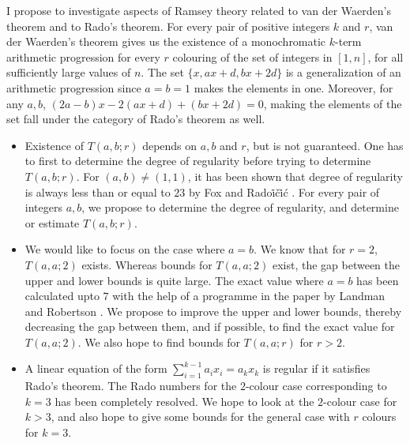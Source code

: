 \documentclass[12pt]{report}
\begin{document}
\noindent I propose to investigate aspects of Ramsey theory related to van der Waerden's theorem and to Rado's theorem. For every pair of positive integers $k$ and $r$, van der Waerden's theorem gives us the existence of a monochromatic $k$-term arithmetic progression for every $r$ colouring of the set of integers in $[1,n]$, for all sufficiently large values of $n$. The set $\{x,ax+d,bx+2d\}$ is a generalization of an arithmetic progression since $a=b=1$ makes the elements in one. Moreover, for any $a,b$, $(2a-b)x-2(ax+d)+(bx+2d)=0$, making the elements of the set fall under the category of Rado's theorem as well.  
\begin{itemize}
\item
Existence of $T(a,b;r)$ depends on $a,b$ and $r$, but is not guaranteed. One has to first to determine the degree of regularity before trying to determine $T(a,b;r)$. For $(a,b)\neq (1,1)$, it has been shown that degree of regularity is always less than or equal to $23$ by Fox and Rado\.{i}\v{c}\.{i}\'{c} {\cite{FR}}. For every pair of integers $a,b$, we propose to determine the degree of regularity, and determine or estimate $T(a,b;r)$.
\item
We would like to focus on the case where $a=b$. We know that for $r=2$, $T(a,a;2)$ exists. Whereas bounds for $T(a,a;2)$ exist, the  gap between the upper and lower bounds is quite large. The exact value where $a=b$ has been calculated upto $7$ with the help of a programme in the paper by Landman and Robertson {\cite{LR02}}. We propose to improve the upper and lower bounds, thereby decreasing the gap between them, and if possible, to find the exact value for $T(a,a;2)$. We also hope to find bounds for $T(a,a;r)$ for $r>2$.   
\item
A linear equation of the form $\sum_{i=1}^{k-1} a_ix_i=a_kx_k$ is regular if it satisfies Rado's theorem. The Rado numbers for the $2$-colour case corresponding to $k=3$ has been completely resolved. We hope to look at the $2$-colour case for $k>3$, and also hope to give some bounds for the general case with $r$ colours for $k=3$.   
\end{itemize}
\end{document}
